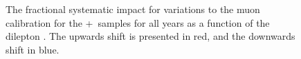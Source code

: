 \begin{figure}[h!]
  \caption{The fractional systematic impact for variations to the muon calibration for the \powheg+\pythia~samples for all years as a function of the dilepton \pt. The upwards shift is presented in red, and the downwards shift in blue.}
  \label{fig:PP8MuCalSystpTll}
\end{figure}

